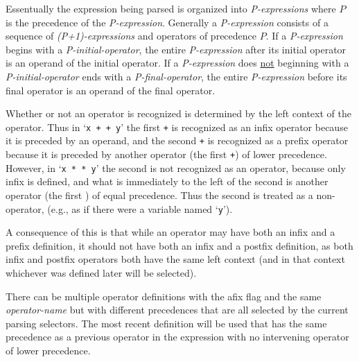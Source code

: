 \documentclass[12pt]{article}
\begin{document}
Essentually the expression being parsed is organized into {\em P-expressions}
where $P$ is the precedence of the {\em P-expression}.  Generally
a {\em P-expression} consists of a sequence of {\em (P+1)-expressions}
and operators of precedence $P$.
If a {\em P-expression} begins with a {\em P-initial-operator},
the entire {\em P-expression} after its initial operator is an operand
of the initial operator.
If a {\em P-expression} does \underline{not} beginning
with a {\em P-initial-operator} ends with a {\em P-final-operator},
the entire {\em P-expression} before its final operator is an operand
of the final operator.

Whether or not an operator is recognized is determined by the left
context of the operator.  Thus in `{\tt x + + y}' the first {\tt +}
is recognized as an infix operator because it is preceded by an operand,
and the second {\tt +} is recognized as a prefix operator because it
is preceded by another operator (the first {\tt +}) of lower precedence.
However, in `{\tt x * * y}' the second {\tt *} is not recognized as
an operator, because only infix {\tt *} is defined, and what is immediately
to the left of the second {\tt *} is another operator (the first {\tt *})
of equal precedence.  Thus the second {\tt *} is treated as a non-operator,
(e.g., as if there were a variable named `{\tt * y}').

A consequence of this is that while an operator may have both an
infix and a prefix definition, it should not have both an infix and
a postfix definition, as both infix and postfix operators both have the
same left context (and in that context whichever was defined later will
be selected).

There can be multiple operator definitions with the afix flag
and the same {\em operator-name} but with different precedences
that are all selected by the current parsing selectors.  The most
recent definition will be used that has the same precedence
as a previous operator in the expression with no intervening
operator of lower precedence.
\end{document}
